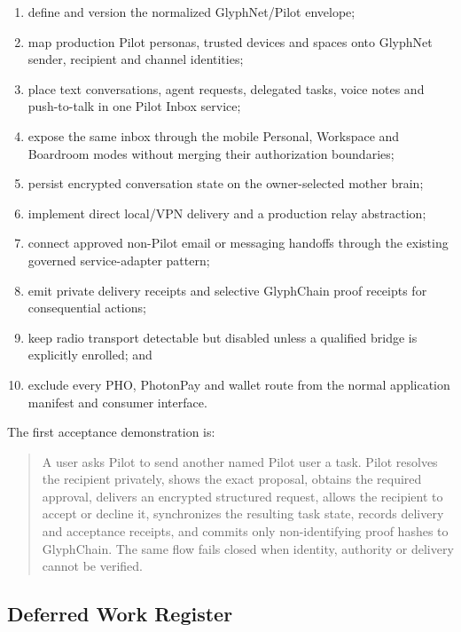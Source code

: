 \begin{enumerate}
  \item define and version the normalized GlyphNet/Pilot envelope;
  \item map production Pilot personas, trusted devices and spaces onto GlyphNet
        sender, recipient and channel identities;
  \item place text conversations, agent requests, delegated tasks, voice notes
        and push-to-talk in one Pilot Inbox service;
  \item expose the same inbox through the mobile Personal, Workspace and
        Boardroom modes without merging their authorization boundaries;
  \item persist encrypted conversation state on the owner-selected mother brain;
  \item implement direct local/VPN delivery and a production relay abstraction;
  \item connect approved non-Pilot email or messaging handoffs through the
        existing governed service-adapter pattern;
  \item emit private delivery receipts and selective GlyphChain proof receipts
        for consequential actions;
  \item keep radio transport detectable but disabled unless a qualified bridge
        is explicitly enrolled; and
  \item exclude every PHO, PhotonPay and wallet route from the normal application
        manifest and consumer interface.
\end{enumerate}

The first acceptance demonstration is:

\begin{quote}
A user asks Pilot to send another named Pilot user a task. Pilot resolves the
recipient privately, shows the exact proposal, obtains the required approval,
delivers an encrypted structured request, allows the recipient to accept or
decline it, synchronizes the resulting task state, records delivery and
acceptance receipts, and commits only non-identifying proof hashes to
GlyphChain. The same flow fails closed when identity, authority or delivery
cannot be verified.
\end{quote}

\subsection{Deferred Work Register}

